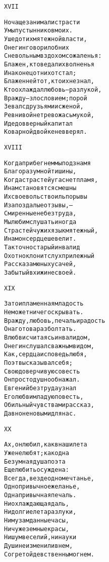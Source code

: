 \begin{minipage}[t]{\dimexpr 0.5\textwidth -\tabcolsep-.5pt}
\begin{alltt}\normalfont\centering
XVII

Но чаще занимали страсти
Умы пустынников моих.
Ушед от их мятежной власти,
Онегин говорил об них
С невольным вздохом сожаленья:
Блажен, кто ведал их волненья
И наконец от них отстал;
Блаженней тот, кто их не знал,
Кто охлаждал любовь — разлукой,
Вражду — злословием; порой
Зевал с друзьями и с женой,
Ревнивой не тревожась мукой,
И дедов верный капитал
Коварной двойке не вверял.
\end{alltt}
\end{minipage}

\begin{minipage}[t]{\dimexpr 0.5\textwidth -\tabcolsep-.5pt}
\begin{alltt}\normalfont\centering
XVIII

Когда прибегнем мы под знамя
Благоразумной тишины,
Когда страстей угаснет пламя,
И нам становятся смешны
Их своевольство иль порывы
И запоздалые отзывы, —
Смиренные не без труда,
Мы любим слушать иногда
Страстей чужих язык мятежный,
И нам он сердце шевелит.
Так точно старый инвалид
Охотно клонит слух прилежный
Рассказам юных усачей,
Забытый в хижине своей.
\end{alltt}
\end{minipage}
\clearpage

\begin{minipage}[t]{\dimexpr 0.5\textwidth -\tabcolsep-.5pt}
\begin{alltt}\normalfont\centering
XIX

Зато и пламенная младость
Не может ничего скрывать.
Вражду, любовь, печаль и радость
Она готова разболтать.
В любви считаясь инвалидом,
Онегин слушал с важным видом,
Как, сердца исповедь любя,
Поэт высказывал себя;
Свою доверчивую совесть
Он простодушно обнажал.
Евгений без труда узнал
Его любви младую повесть,
Обильный чувствами рассказ,
Давно не новыми для нас.
\end{alltt}
\end{minipage}

\begin{minipage}[t]{\dimexpr 0.5\textwidth -\tabcolsep-.5pt}
\begin{alltt}\normalfont\centering
XX

Ах, он любил, как в наши лета
Уже не любят; как одна
Безумная душа поэта
Еще любить осуждена:
Всегда, везде одно мечтанье,
Одно привычное желанье,
Одна привычная печаль.
Ни охлаждающая даль,
Ни долгие лета разлуки,
Ни музам данные часы,
Ни чужеземные красы,
Ни шум веселий, ни науки
Души не изменили в нем,
Согретой девственным огнем.
\end{alltt}
\end{minipage}
\clearpage

